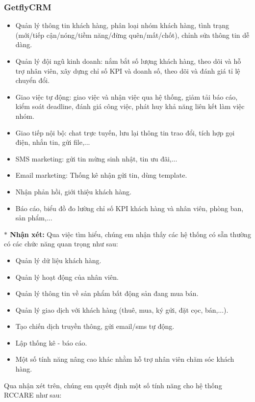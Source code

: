 \documentclass[12pt,a4paper]{article}
\begin{document}
    \subsubsection*{GetflyCRM}
    \begin{itemize}
        \item Quản lý thông tin khách hàng, phân loại nhóm khách hàng, tình trạng (mới/tiếp cận/nóng/tiềm năng/đừng quên/mất/chốt), chỉnh sửa thông tin dễ dàng.
        \item Quản lý đội ngũ kinh doanh: nắm bắt số lượng khách hàng, theo dõi và hỗ trợ nhân viên, xây dựng chỉ số KPI và doanh số, theo dõi và đánh giá tỉ lệ chuyển đổi.
        \item Giao việc tự động: giao việc và nhận việc qua hệ thống, giảm tải báo cáo, kiểm soát deadline, đánh giá công việc, phát huy khả năng liên kết làm việc nhóm.
        \item Giao tiếp nội bộ: chat trực tuyến, lưu lại thông tin trao đổi, tích hợp gọi điện, nhắn tin, gửi file,...
        \item SMS marketing: gửi tin mừng sinh nhật, tin ưu đãi,...
        \item Email marketing: Thống kê nhận gửi tin, dùng template.
        \item Nhận phản hồi, giới thiệu khách hàng.
        \item Báo cáo, biểu đồ đo lường chỉ số KPI khách hàng và nhân viên, phòng ban, sản phẩm,...
    \end{itemize}
    \textbf{$\ast$ Nhận xét:} Qua việc tìm hiểu, chúng em nhận thấy các hệ thống có sẵn thường có các chức năng quan trọng như sau:
    \begin{itemize}
        \item Quản lý dữ liệu khách hàng.
        \item Quản lý hoạt động của nhân viên.
        \item Quản lý thông tin về sản phẩm bất động sản đang mua bán.
        \item Quản lý giao dịch với khách hàng (thuê, mua, ký gửi, đặt cọc, bán,...).
        \item Tạo chiến dịch truyền thông, gửi email/sms tự động.
        \item Lập thống kê - báo cáo.
        \item Một số tính năng nâng cao khác nhằm hỗ trợ nhân viên chăm sóc khách hàng.
    \end{itemize}

    Qua nhận xét trên, chúng em quyết định một số tính năng cho hệ thống RCCARE như sau:
\end{document}
